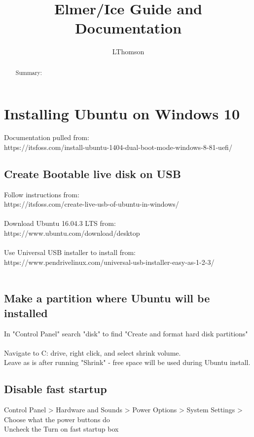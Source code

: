 \documentclass[]{article}
\title{Elmer/Ice Guide and Documentation}
\author{LThomson}
\begin{document}
\maketitle

\begin{abstract}
Summary: 
\end{abstract}

\section{Installing Ubuntu on Windows 10}
Documentation pulled from: \\
https://itsfoss.com/install-ubuntu-1404-dual-boot-mode-windows-8-81-uefi/

\subsection{Create Bootable live disk on USB}
Follow instructions from: \\
https://itsfoss.com/create-live-usb-of-ubuntu-in-windows/\\\\
Download Ubuntu 16.04.3 LTS from: \\
https://www.ubuntu.com/download/desktop\\\\
Use Universal USB installer to install from:\\
https://www.pendrivelinux.com/universal-usb-installer-easy-as-1-2-3/\\\\

\subsection{Make a partition where Ubuntu will be installed}
In "Control Panel" search "disk" to find "Create and format hard disk partitions"\\
\\
Navigate to C: drive, right click, and select shrink volume.\\
Leave as is after running "Shrink" - free space will be used during Ubuntu install.

\subsection{Disable fast startup}
Control Panel > Hardware and Sounds > Power Options > System Settings > Choose what the power buttons do\\
Uncheck the Turn on fast startup box
\end{document}
